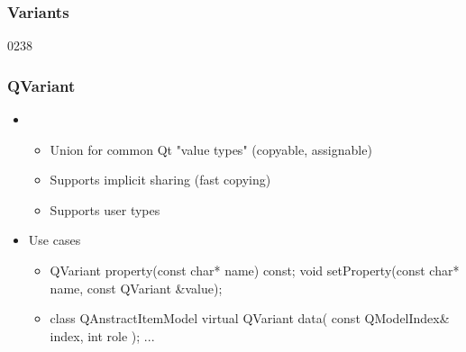 %
%
%
%

\subsubsection{Variants}

\begin{slide}[fragile]{0238}\frametitle{QVariant}
\begin{itemize}
  \item {} 
  \begin{itemize}
    \item Union for common Qt "value types" (copyable, assignable)
    \item Supports implicit sharing (fast copying)
    \item Supports user types
  \end{itemize}\medskip
\item Use cases
  \begin{itemize}
  \item[]
\begin{cpp}
QVariant property(const char* name) const;
void setProperty(const char* name, const QVariant &value);
\end{cpp}\medskip
\item[]
\begin{cpp}
class QAnstractItemModel {
  virtual QVariant data( const QModelIndex& index, int role );
  ...
}
\end{cpp}
  \end{itemize}
\end{itemize}
\end{slide}

